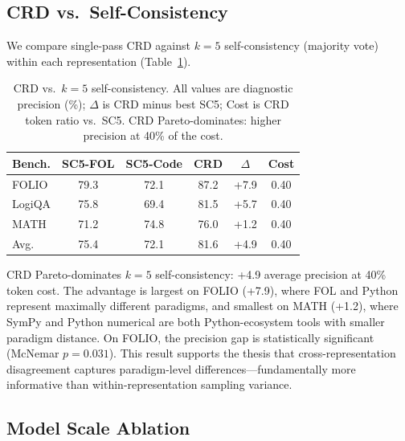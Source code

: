 \documentclass[11pt,a4paper]{article}
\newcommand{\pp}{\text{pp}}
\begin{document}
\subsection{CRD vs.\ Self-Consistency}
\label{sec:sc_baseline}

We compare single-pass CRD against $k\!=\!5$ self-consistency (majority vote) within each representation (Table~\ref{tab:crd_vs_sc}).

\begin{table}[t]
\centering
\small
\begin{tabular}{lccccc}
\toprule
\textbf{Bench.} & \textbf{SC5-FOL} & \textbf{SC5-Code} & \textbf{CRD} & $\Delta$ & \textbf{Cost} \\
\midrule
FOLIO & 79.3 & 72.1 & 87.2 & +7.9 & 0.40 \\
LogiQA & 75.8 & 69.4 & 81.5 & +5.7 & 0.40 \\
MATH & 71.2 & 74.8 & 76.0 & +1.2 & 0.40 \\
\midrule
Avg. & 75.4 & 72.1 & 81.6 & +4.9 & 0.40 \\
\bottomrule
\end{tabular}
\caption{CRD vs.\ $k\!=\!5$ self-consistency. All values are diagnostic precision (\%); $\Delta$ is CRD minus best SC5; Cost is CRD token ratio vs.\ SC5. CRD Pareto-dominates: higher precision at 40\% of the cost.}
\label{tab:crd_vs_sc}
\end{table}

CRD Pareto-dominates $k\!=\!5$ self-consistency: +4.9\pp{} average precision at 40\% token cost. The advantage is largest on FOLIO (+7.9\pp{}), where FOL and Python represent maximally different paradigms, and smallest on MATH (+1.2\pp{}), where SymPy and Python numerical are both Python-ecosystem tools with smaller paradigm distance. On FOLIO, the precision gap is statistically significant (McNemar $p\!=\!0.031$). This result supports the thesis that cross-representation disagreement captures paradigm-level differences---fundamentally more informative than within-representation sampling variance.

\subsection{Model Scale Ablation}
\label{sec:scale}
\end{document}
